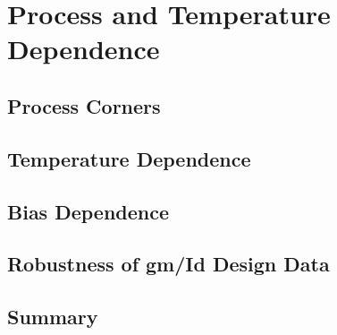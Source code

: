 
\section{Process and Temperature Dependence}
\label{sec:process_temperature}

\subsection{Process Corners}



\subsection{Temperature Dependence}



\subsection{Bias Dependence}



\subsection{Robustness of gm/Id Design Data}



\subsection{Summary}

